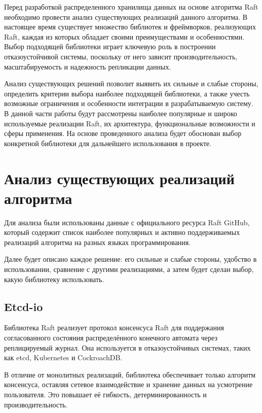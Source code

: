 
Перед разработкой распределенного хранилища данных на основе алгоритма Raft необходимо
провести анализ существующих реализаций данного алгоритма. В настоящее время существует
множество библиотек и фреймворков, реализующих Raft, каждая из которых обладает своими
преимуществами и особенностями. Выбор подходящей библиотеки играет ключевую роль в
построении отказоустойчивой системы, поскольку от него зависит производительность,
масштабируемость и надежность репликации данных.

Анализ существующих решений позволит выявить их сильные и слабые стороны, определить
критерии выбора наиболее подходящей библиотеки, а также учесть возможные ограничения и
особенности интеграции в разрабатываемую систему. В данной части работы будут
рассмотрены наиболее популярные и широко используемые реализации Raft, их архитектура,
функциональные возможности и сферы применения. На основе проведенного анализа будет
обоснован выбор конкретной библиотеки для дальнейшего использования в проекте.

\section{Анализ существующих реализаций алгоритма}

Для анализа были использованы данные с официального ресурса Raft GitHub, который
содержит список наиболее популярных и активно поддерживаемых реализаций алгоритма на
разных языках программирования.

Далее будет описано каждое решение: его сильные и слабые стороны, удобство в использовании, сравнение с другими
реализациями, а затем будет сделан выбор, какую библиотеку использовать.

\subsection{Etcd-io}

Библиотека Raft \cite{etcdraft} реализует протокол консенсуса Raft для поддержания согласованного
состояния распределённого конечного автомата через реплицируемый журнал. Она
используется в отказоустойчивых системах, таких как etcd, Kubernetes и CockroachDB.

В отличие от монолитных реализаций, библиотека обеспечивает только алгоритм консенсуса,
оставляя сетевое взаимодействие и хранение данных на усмотрение пользователя. Это
повышает её гибкость, детерминированность и производительность.

